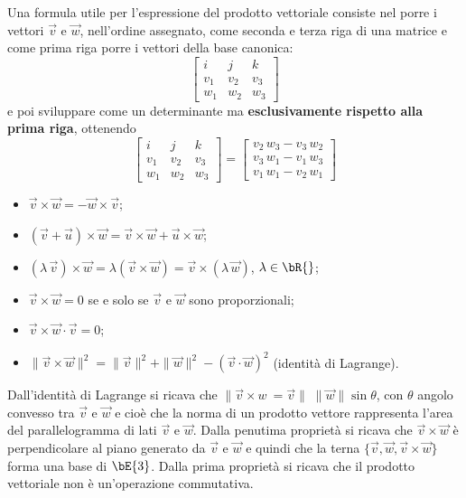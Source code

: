 Una formula utile per l'espressione del prodotto vettoriale consiste nel porre i 
vettori
$\vec v$ e $\vec w$, nell'ordine assegnato, come seconda e terza riga di una 
matrice
e come prima riga porre i vettori della base canonica:
\[\begin{bmatrix}
  i& j & k\\
  v_1 & v_2 & v_3\\
  w_1 & w_2 &w_3
\end{bmatrix}\]
e poi sviluppare come un determinante ma {\bf esclusivamente rispetto alla
prima riga}, ottenendo
\[\begin{bmatrix}
    i& j & k\\
    v_1 & v_2 & v_3\\
    w_1 & w_2 &w_3
  \end{bmatrix} = 
  \begin{bmatrix} 
        v_2\,w_3 - v_3\,w_2 \\
        v_3\,w_1 - v_1\,w_3 \\
        v_1\,w_1-v_2\,w_1
  \end{bmatrix}
\]
\begin{proprieta}
  \begin{itemize}
    \item $\vec v\times \vec w = - \vec w\times \vec v$;
    \item $(\vec v+\vec u)\times \vec w = \vec v\times \vec w + \vec u\times\vec 
w$;
    \item $(\lambda\, \vec v)\times \vec w = 
              \lambda (\vec v\times \vec w) = \vec v\times(\lambda\, \vec w)$, 
$\lambda\in\bR{}$;
    \item $\vec v\times \vec w = 0$ se e solo se $\vec v$ e $\vec w$ sono 
proporzionali;
    \item $\vec v\times \vec w \cdot \vec v = 0$;
    \item $\|\vec v\times\vec w\|^2 = \|\vec v\|^2+\|\vec w\|^2 - (\vec 
v\cdot\vec w)^2$ 
              (identit\`a di Lagrange).
  \end{itemize}
\end{proprieta}
Dall'identit\`a di Lagrange si ricava che $\|\vec v\times w\ = \vec v\|\;\|\vec 
w\| \sin\theta$, con
$\theta$ angolo convesso tra $\vec v$ e $\vec w$ e cio\`e che la norma di un 
prodotto vettore rappresenta l'area del parallelogramma di lati $\vec v$ e $\vec 
w$. Dalla penutima propriet\`a
si ricava che $\vec v\times \vec w$ \`e perpendicolare al piano generato da 
$\vec v$ e $\vec w$
e quindi che la terna $\{\vec v,\vec w,\vec v\times\vec w\}$ forma una base di 
$\bE{3}$.
Dalla prima propriet\`a si ricava che il prodotto vettoriale non \`e 
un'operazione commutativa.\\

